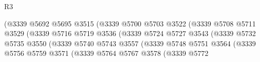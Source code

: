 \begin{lexlean}{R3}
\begin{coremodule}
                                              (@3339
                                                @5692
                                                @5695
                                                @3515
                                                (@3339
                                                  @5700
                                                  @5703
                                                  @3522
                                                  (@3339
                                                    @5708
                                                    @5711
                                                    @3529
                                                    (@3339
                                                      @5716
                                                      @5719
                                                      @3536
                                                      (@3339
                                                        @5724
                                                        @5727
                                                        @3543
                                                        (@3339
                                                          @5732
                                                          @5735
                                                          @3550
                                                          (@3339
                                                            @5740
                                                            @5743
                                                            @3557
                                                            (@3339
                                                              @5748
                                                              @5751
                                                              @3564
                                                              (@3339
                                                                @5756
                                                                @5759
                                                                @3571
                                                                (@3339
                                                                  @5764
                                                                  @5767
                                                                  @3578
                                                                  (@3339
                                                                    @5772

\end{coremodule}
\end{lexlean}
